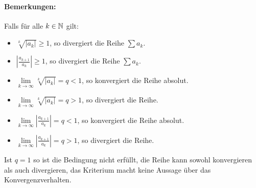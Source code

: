 \paragraph{Bemerkungen:}
Falls für alle $k\in\mathbb{N}$ gilt:
\begin{itemize}
	\item $\sqrt[k]{|a_k|} \geq 1$, so divergiert die Reihe $\sum a_k$.
	\item $\left|\frac{a_{k+1}}{a_k}\right|\geq 1$, so divergiert die Reihe $\sum a_k$.
	\item $\lim\limits_{k\to\infty} \sqrt[k]{|a_k|} = q< 1$, so konvergiert die Reihe absolut.
	\item $\lim\limits_{k\to\infty} \sqrt[k]{|a_k|} = q> 1$, so divergiert die Reihe.
	\item $\lim\limits_{k\to\infty} \left|\frac{a_{k+1}}{a_k}\right| = q< 1$, so konvergiert die Reihe absolut.
	\item $\lim\limits_{k\to\infty} \left|\frac{a_{k+1}}{a_k}\right| = q> 1$, so divergiert die Reihe.
\end{itemize}
Ist $q=1$ so ist die Bedingung nicht erfüllt, die Reihe kann sowohl konvergieren als auch divergieren, das Kriterium macht keine Aussage über das Konvergenzverhalten.

